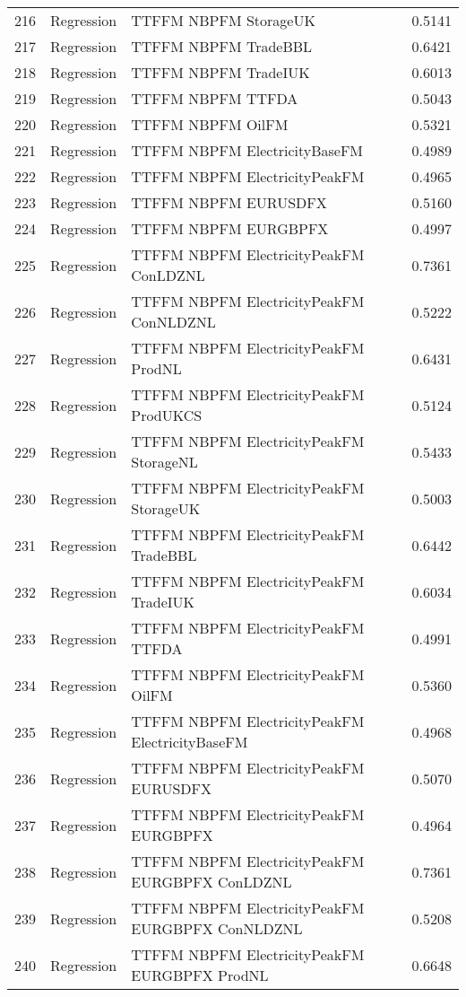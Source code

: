 \begin{table}[ht]
\begin{tabular}{rllr}
  216 & Regression & TTFFM NBPFM StorageUK & 0.5141 \\ 
  217 & Regression & TTFFM NBPFM TradeBBL & 0.6421 \\ 
  218 & Regression & TTFFM NBPFM TradeIUK & 0.6013 \\ 
  219 & Regression & TTFFM NBPFM TTFDA & 0.5043 \\ 
  220 & Regression & TTFFM NBPFM OilFM & 0.5321 \\ 
  221 & Regression & TTFFM NBPFM ElectricityBaseFM & 0.4989 \\ 
  222 & Regression & TTFFM NBPFM ElectricityPeakFM & 0.4965 \\ 
  223 & Regression & TTFFM NBPFM EURUSDFX & 0.5160 \\ 
  224 & Regression & TTFFM NBPFM EURGBPFX & 0.4997 \\ 
  225 & Regression & TTFFM NBPFM ElectricityPeakFM ConLDZNL & 0.7361 \\ 
  226 & Regression & TTFFM NBPFM ElectricityPeakFM ConNLDZNL & 0.5222 \\ 
  227 & Regression & TTFFM NBPFM ElectricityPeakFM ProdNL & 0.6431 \\ 
  228 & Regression & TTFFM NBPFM ElectricityPeakFM ProdUKCS & 0.5124 \\ 
  229 & Regression & TTFFM NBPFM ElectricityPeakFM StorageNL & 0.5433 \\ 
  230 & Regression & TTFFM NBPFM ElectricityPeakFM StorageUK & 0.5003 \\ 
  231 & Regression & TTFFM NBPFM ElectricityPeakFM TradeBBL & 0.6442 \\ 
  232 & Regression & TTFFM NBPFM ElectricityPeakFM TradeIUK & 0.6034 \\ 
  233 & Regression & TTFFM NBPFM ElectricityPeakFM TTFDA & 0.4991 \\ 
  234 & Regression & TTFFM NBPFM ElectricityPeakFM OilFM & 0.5360 \\ 
  235 & Regression & TTFFM NBPFM ElectricityPeakFM ElectricityBaseFM & 0.4968 \\ 
  236 & Regression & TTFFM NBPFM ElectricityPeakFM EURUSDFX & 0.5070 \\ 
  237 & Regression & TTFFM NBPFM ElectricityPeakFM EURGBPFX & 0.4964 \\ 
  238 & Regression & TTFFM NBPFM ElectricityPeakFM EURGBPFX ConLDZNL & 0.7361 \\ 
  239 & Regression & TTFFM NBPFM ElectricityPeakFM EURGBPFX ConNLDZNL & 0.5208 \\ 
  240 & Regression & TTFFM NBPFM ElectricityPeakFM EURGBPFX ProdNL & 0.6648 \\ 

\end{tabular}
\end{table}
